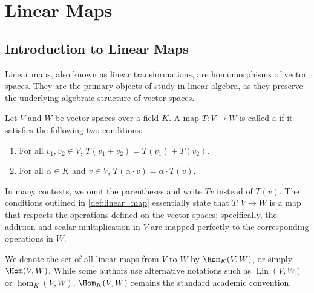 \renewcommand{\thetheorem}{15.a.\arabic{theorem}}
\setcounter{theorem}{0}

\setcounter{chapter}{14} %
\chapter{Linear Maps}


\section{Introduction to Linear Maps}
\label{sec:intro_linear_maps}

Linear maps, also known as linear transformations, are homomorphisms of vector spaces. They are the primary objects of study in linear algebra, as they preserve the underlying algebraic structure of vector spaces.

\begin{definition}
\label{def:linear_map}
Let $V$ and $W$ be vector spaces over a field $K$. A map $T: V \to W$ is called a  if it satisfies the following two conditions:
\begin{enumerate}
    \item For all $v_1, v_2 \in V$, $T(v_1 + v_2) = T(v_1) + T(v_2)$.
    \item For all $\alpha \in K$ and $v \in V$, $T(\alpha \cdot v) = \alpha \cdot T(v)$.
\end{enumerate}
\end{definition}

\begin{remark}
\label{rem:linear_map_notation}
In many contexts, we omit the parentheses and write $Tv$ instead of $T(v)$. The conditions outlined in \cref{def:linear_map} essentially state that $T: V \to W$ is a map that respects the operations defined on the vector spaces; specifically, the addition and scalar multiplication in $V$ are mapped perfectly to the corresponding operations in $W$.

We denote the set of all linear maps from $V$ to $W$ by $\Hom_K(V, W)$, or simply $\Hom(V, W)$. While some authors use alternative notations such as $\operatorname{Lin}(V, W)$ or $\hom_K(V, W)$, $\Hom_K(V, W)$ remains the standard academic convention.
\end{remark}

